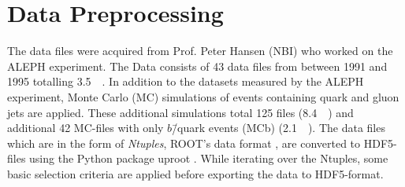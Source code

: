 

\section{Data Preprocessing}
\label{sec:q:data_preprocessing}

The data files were acquired from Prof. Peter Hansen (NBI) who worked on the ALEPH experiment. The Data consists of \num{43} data files from between \num{1991} and \num{1995} totalling \SI{3.5}{\giga\byte}. In addition to the datasets measured by the ALEPH experiment, Monte Carlo (MC) simulations of events containing quark and gluon jets are applied. These additional simulations total \num{125} files (\SI{8.4}{\giga\byte}) and additional \num{42} MC-files with only $b$\=/quark events (MCb) (\SI{2.1}{\giga\byte}). The data files which are in the form of \emph{Ntuples}, ROOT's data format \autocite{brunROOTObjectOriented1997}, are converted to HDF5-files using the Python package uproot \autocite{ScikithepUproot2019}. While iterating over the Ntuples, some basic selection criteria are applied before exporting the data to HDF5-format. 

